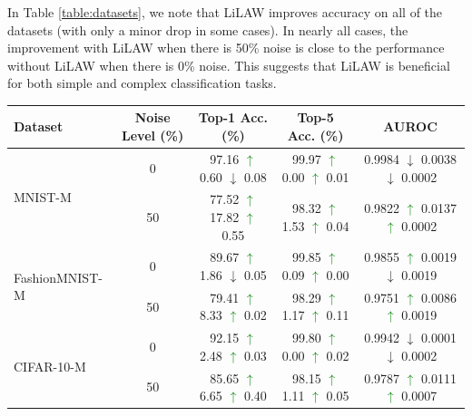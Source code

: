 \documentclass{article}
\theoremstyle{plain}
\theoremstyle{definition}
\theoremstyle{remark}
\begin{document}
In Table \ref{table:datasets}, we note that LiLAW improves accuracy on all of the datasets (with only a minor drop in some cases). In nearly all cases, the improvement with LiLAW when there is 50\% noise is close to the performance without LiLAW when there is 0\% noise. This suggests that LiLAW is beneficial for both simple and complex classification tasks.

\begin{table}[h!] \centering \footnotesize{ \begin{tabular}{l|cccc} \hline \textbf{Dataset} & \textbf{Noise Level (\%)} & \textbf{Top-1 Acc. (\%)} & \textbf{Top-5 Acc. (\%)} & \textbf{AUROC} \\ \hline
\multirow{2}{*}{MNIST-M} & 0 & 97.16 \textcolor{Green}{$\uparrow$} \hspace{0.5em}0.60 \textcolor{BrickRed}{$\downarrow$} 0.08  & 99.97 \textcolor{Green}{$\uparrow$} 0.00 \textcolor{Green}{$\uparrow$} 0.01 & 0.9984 \textcolor{BrickRed}{$\downarrow$} 0.0038 \textcolor{BrickRed}{$\downarrow$} 0.0002 \\ & 50 & 77.52 \textcolor{Green}{$\uparrow$} 17.82 \textcolor{Green}{$\uparrow$} 0.55 & 98.32 \textcolor{Green}{$\uparrow$} 1.53 \textcolor{Green}{$\uparrow$} 0.04 & 0.9822 \textcolor{Green}{$\uparrow$} 0.0137 \textcolor{Green}{$\uparrow$} 0.0002 \\ \hline 

\multirow{2}{*}{FashionMNIST-M} & 0 & 89.67 \textcolor{Green}{$\uparrow$} \hspace{0.5em}1.86 \textcolor{BrickRed}{$\downarrow$} 0.05 & 99.85 \textcolor{Green}{$\uparrow$} 0.09 \textcolor{Green}{$\uparrow$} 0.00 & 0.9855 \textcolor{Green}{$\uparrow$} 0.0019 \textcolor{BrickRed}{$\downarrow$} 0.0019 \\ & 50 & 79.41 \textcolor{Green}{$\uparrow$} \hspace{0.5em}8.33 \textcolor{Green}{$\uparrow$} 0.02 & 98.29 \textcolor{Green}{$\uparrow$} 1.17 \textcolor{Green}{$\uparrow$} 0.11 & 0.9751 \textcolor{Green}{$\uparrow$} 0.0086 \textcolor{Green}{$\uparrow$} 0.0019 \\ \hline 

\multirow{2}{*}{CIFAR-10-M} & 0 & 92.15 \textcolor{Green}{$\uparrow$} \hspace{0.5em}2.48 \textcolor{Green}{$\uparrow$} 0.03 & 99.80 \textcolor{Green}{$\uparrow$} 0.00 \textcolor{Green}{$\uparrow$} 0.02 & 0.9942 \textcolor{BrickRed}{$\downarrow$} 0.0001 \textcolor{BrickRed}{$\downarrow$} 0.0002 \\ & 50 & 85.65 \textcolor{Green}{$\uparrow$} \hspace{0.5em}6.65 \textcolor{Green}{$\uparrow$} 0.40 & 98.15 \textcolor{Green}{$\uparrow$} 1.11 \textcolor{Green}{$\uparrow$} 0.05 & 0.9787 \textcolor{Green}{$\uparrow$} 0.0111 \textcolor{Green}{$\uparrow$} 0.0007 \\  \hline 


\end{tabular}}
\end{table}
\end{document}
